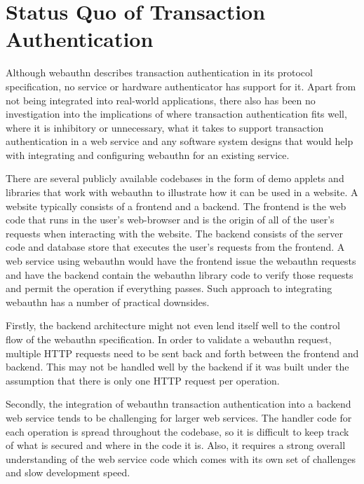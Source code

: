 \section{Status Quo of Transaction Authentication}\label{Sec:StatusQuo}

Although webauthn describes transaction authentication in its protocol specification, no service or hardware authenticator has support for it. Apart from not being integrated into real-world applications, there also has been no investigation into the implications of where transaction authentication fits well, where it is inhibitory or unnecessary, what it takes to support transaction authentication in a web service and any software system designs that would help with integrating and configuring webauthn for an existing service.


There are several publicly available codebases in the form of demo applets and libraries that work with webauthn \cite{TODO-webauthn-codebases-from-webauthn-website} to illustrate how it can be used in a website. A website typically consists of a frontend and a backend. The frontend is the web code that runs in the user's web-browser and is the origin of all of the user's requests when interacting with the website. The backend consists of the server code and database store that executes the user's requests from the frontend. A web service using webauthn would have the frontend issue the webauthn requests and have the backend contain the webauthn library code to verify those requests and permit the operation if everything passes. Such approach to integrating webauthn has a number of practical downsides. 


Firstly, the backend architecture might not even lend itself well to the control flow of the webauthn specification. In order to validate a webauthn request, multiple HTTP requests need to be sent back and forth between the frontend and backend. This may not be handled well by the backend if it was built under the assumption that there is only one HTTP request per operation.

Secondly, the integration of webauthn transaction authentication into a backend web service tends to be challenging for larger web services. The handler code for each operation is spread throughout the codebase, so it is difficult to keep track of what is secured and where in the code it is. Also, it requires a strong overall understanding of the web service code which comes with its own set of challenges and slow development speed.

